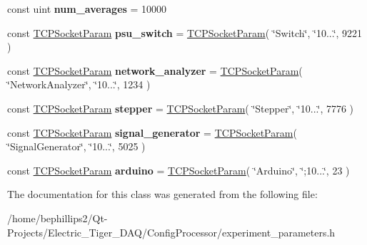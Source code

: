 \begin{DoxyCompactItemize}
\item 
const uint {\bfseries num\+\_\+averages} = 10000\hypertarget{class_experiment_parameters_a7434e2b3a7f7eccdc212cc55651922e2}{}\label{class_experiment_parameters_a7434e2b3a7f7eccdc212cc55651922e2}

\item 
const \hyperlink{struct_t_c_p_socket_param}{T\+C\+P\+Socket\+Param} {\bfseries psu\+\_\+switch} = \hyperlink{struct_t_c_p_socket_param}{T\+C\+P\+Socket\+Param}( \char`\"{}Switch\char`\"{}, \char`\"{}10...\char`\"{}, 9221 )\hypertarget{class_experiment_parameters_ae700482ce71b3a5558ee41093913297a}{}\label{class_experiment_parameters_ae700482ce71b3a5558ee41093913297a}

\item 
const \hyperlink{struct_t_c_p_socket_param}{T\+C\+P\+Socket\+Param} {\bfseries network\+\_\+analyzer} = \hyperlink{struct_t_c_p_socket_param}{T\+C\+P\+Socket\+Param}( \char`\"{}Network\+Analyzer\char`\"{}, \char`\"{}10...\char`\"{}, 1234 )\hypertarget{class_experiment_parameters_afa22bbf371056c9f48ab16fc75ae8bc7}{}\label{class_experiment_parameters_afa22bbf371056c9f48ab16fc75ae8bc7}

\item 
const \hyperlink{struct_t_c_p_socket_param}{T\+C\+P\+Socket\+Param} {\bfseries stepper} = \hyperlink{struct_t_c_p_socket_param}{T\+C\+P\+Socket\+Param}( \char`\"{}Stepper\char`\"{}, \char`\"{}10...\char`\"{}, 7776 )\hypertarget{class_experiment_parameters_ae51cbbd261707bafe2cfd50cef214cb5}{}\label{class_experiment_parameters_ae51cbbd261707bafe2cfd50cef214cb5}

\item 
const \hyperlink{struct_t_c_p_socket_param}{T\+C\+P\+Socket\+Param} {\bfseries signal\+\_\+generator} = \hyperlink{struct_t_c_p_socket_param}{T\+C\+P\+Socket\+Param}( \char`\"{}Signal\+Generator\char`\"{}, \char`\"{}10...\char`\"{}, 5025 )\hypertarget{class_experiment_parameters_a3433956c9a6d19db55ce7ea22c3ec731}{}\label{class_experiment_parameters_a3433956c9a6d19db55ce7ea22c3ec731}

\item 
const \hyperlink{struct_t_c_p_socket_param}{T\+C\+P\+Socket\+Param} {\bfseries arduino} = \hyperlink{struct_t_c_p_socket_param}{T\+C\+P\+Socket\+Param}( \char`\"{}Arduino\char`\"{}, \char`\"{};10...\char`\"{}, 23 )\hypertarget{class_experiment_parameters_a3657583fc47ddc41cacc1954297fe8ba}{}\label{class_experiment_parameters_a3657583fc47ddc41cacc1954297fe8ba}

\end{DoxyCompactItemize}


The documentation for this class was generated from the following file\+:\begin{DoxyCompactItemize}
\item 
/home/bephillips2/\+Qt-\/\+Projects/\+Electric\+\_\+\+Tiger\+\_\+\+D\+A\+Q/\+Config\+Processor/experiment\+\_\+parameters.\+h\end{DoxyCompactItemize}
